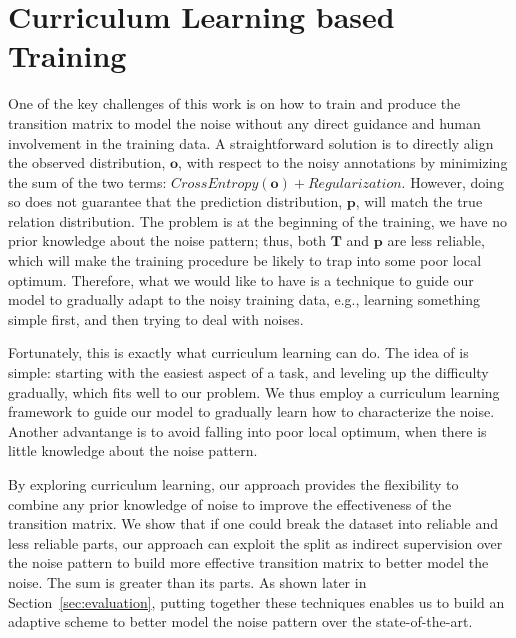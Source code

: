 \section{Curriculum Learning based Training \label{sec:training}}

One of the key challenges of this work is  on how to train and produce the transition matrix to model the noise without any direct guidance and human involvement in the training data.
A straightforward solution is to directly align the observed distribution, $\mathbf{o}$, with respect to the noisy annotations by minimizing the sum of the two terms:
$CrossEntropy(\mathbf{o}) + Regularization$. However, doing so
does not guarantee that the prediction distribution, $\mathbf{p}$, will match the true relation distribution.
The problem is at the beginning of the training, we have no prior knowledge about the noise pattern; thus, both  $\mathbf{T}$ and $\mathbf{p}$ are less reliable, which will make the training procedure be likely to trap into some poor local optimum.
Therefore, what we would like to have is a technique to guide our model to gradually adapt to the noisy training data, e.g., learning something simple first, and then trying to deal with noises.

Fortunately, this is exactly what curriculum learning can do.
The idea of  is simple: starting with the easiest aspect of a task, and leveling up the difficulty gradually,
which fits well to our problem.
We thus employ a curriculum
learning framework to guide our model to gradually learn how to characterize the noise. 
Another advantange is to avoid falling into poor local optimum,
when there is little knowledge about the noise pattern. 


By exploring curriculum learning, our approach  provides the
flexibility to combine any prior knowledge of noise to improve the
effectiveness of  the transition matrix. 
We show that if one could break the
dataset into reliable and less reliable parts, our approach can exploit the split
as indirect supervision over the noise pattern to build more effective
transition matrix to better model the noise. The sum is greater than its parts.
As shown later in Section~\ref{sec:evaluation}, putting together these techniques
enables us to build an adaptive scheme to better model the noise pattern over the state-of-the-art.




